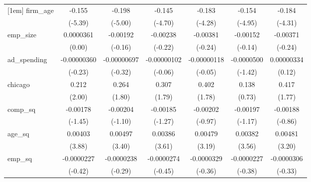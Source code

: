 {\begin{tabular}{l*{6}{c}}
[1em]
firm\_age    &      -0.155\sym{***}&      -0.198\sym{***}&      -0.145\sym{***}&      -0.183\sym{***}&      -0.154\sym{***}&      -0.184\sym{***}\\
            &     (-5.39)         &     (-5.00)         &     (-4.70)         &     (-4.28)         &     (-4.95)         &     (-4.31)         \\
[1em]
emp\_size    &   0.0000361         &    -0.00192         &    -0.00238         &    -0.00381         &    -0.00152         &    -0.00371         \\
            &      (0.00)         &     (-0.16)         &     (-0.22)         &     (-0.24)         &     (-0.14)         &     (-0.24)         \\
[1em]
ad\_spending & -0.00000360         & -0.00000697         & -0.00000102         & -0.00000118         &  -0.0000500         &  0.00000334         \\
            &     (-0.23)         &     (-0.32)         &     (-0.06)         &     (-0.05)         &     (-1.42)         &      (0.12)         \\
[1em]
chicago     &       0.212\sym{*}  &       0.264         &       0.307         &       0.402         &       0.138         &       0.417         \\
            &      (2.00)         &      (1.80)         &      (1.79)         &      (1.78)         &      (0.73)         &      (1.77)         \\
[1em]
comp\_sq     &    -0.00178         &    -0.00204         &    -0.00185         &    -0.00202         &    -0.00197         &    -0.00188         \\
            &     (-1.45)         &     (-1.10)         &     (-1.27)         &     (-0.97)         &     (-1.17)         &     (-0.86)         \\
[1em]
age\_sq      &     0.00403\sym{***}&     0.00497\sym{***}&     0.00386\sym{***}&     0.00479\sym{**} &     0.00382\sym{***}&     0.00481\sym{**} \\
            &      (3.88)         &      (3.40)         &      (3.61)         &      (3.19)         &      (3.56)         &      (3.20)         \\
[1em]
emp\_sq      &  -0.0000227         &  -0.0000238         &  -0.0000274         &  -0.0000329         &  -0.0000227         &  -0.0000306         \\
            &     (-0.42)         &     (-0.29)         &     (-0.45)         &     (-0.36)         &     (-0.38)         &     (-0.33)         \\

\end{tabular}}
